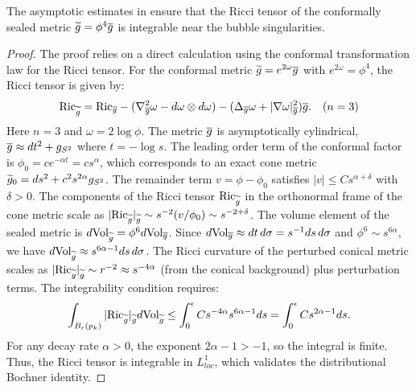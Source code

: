 \begin{corollary}\label{cor:RicciIntegrability}
The asymptotic estimates in  ensure that the Ricci tensor of the conformally sealed metric $\widetilde{g} = \phi^4\overline{g}$ is integrable near the bubble singularities.
\end{corollary}
\begin{proof}
The proof relies on a direct calculation using the conformal transformation law for the Ricci tensor. For the conformal metric $\widetilde{g} = e^{2\omega}\overline{g}$ with $e^{2\omega} = \phi^4$, the Ricci tensor is given by:
\[ \mathrm{Ric}_{\widetilde{g}} = \mathrm{Ric}_{\overline{g}} - (\nabla_{\overline{g}}^2 \omega - d\omega \otimes d\omega) - (\Delta_{\overline{g}}\omega + |\nabla\omega|^2_{\overline{g}})\overline{g}. \quad (n=3) \]
Here $n=3$ and $\omega = 2\log\phi$. The metric $\overline{g}$ is asymptotically cylindrical, $\overline{g} \approx dt^2 + g_{S^2}$ where $t = -\log s$. The leading order term of the conformal factor is $\phi_0 = c e^{-\alpha t} = c s^\alpha$, which corresponds to an exact cone metric $\widetilde{g}_0 = ds^2 + c^2 s^{2\alpha} g_{S^2}$.
The remainder term $v = \phi - \phi_0$ satisfies $|v| \le C s^{\alpha+\delta}$ with $\delta > 0$. The components of the Ricci tensor $\mathrm{Ric}_{\widetilde{g}}$ in the orthonormal frame of the cone metric scale as $|\mathrm{Ric}_{\widetilde{g}}|_{\widetilde{g}} \sim s^{-2} (v/\phi_0) \sim s^{-2+\delta}$.
The volume element of the sealed metric is $d\text{Vol}_{\widetilde{g}} = \phi^6 d\text{Vol}_{\overline{g}}$. Since $d\text{Vol}_{\overline{g}} \approx dt \, d\sigma = s^{-1} ds \, d\sigma$ and $\phi^6 \sim s^{6\alpha}$, we have $d\text{Vol}_{\widetilde{g}} \approx s^{6\alpha-1} ds \, d\sigma$.
The Ricci curvature of the perturbed conical metric scales as $|\mathrm{Ric}_{\widetilde{g}}|_{\widetilde{g}} \sim r^{-2} \approx s^{-4\alpha}$ (from the conical background) plus perturbation terms.
The integrability condition requires:
\[ \int_{B_\epsilon(p_k)} |\mathrm{Ric}_{\widetilde{g}}|_{\widetilde{g}} d\text{Vol}_{\widetilde{g}} \le \int_0^\epsilon C s^{-4\alpha} s^{6\alpha-1} ds = \int_0^\epsilon C s^{2\alpha-1} ds. \]
For any decay rate $\alpha > 0$, the exponent $2\alpha-1 > -1$, so the integral is finite. Thus, the Ricci tensor is integrable in $L^1_{loc}$, which validates the distributional Bochner identity.
\end{proof}


